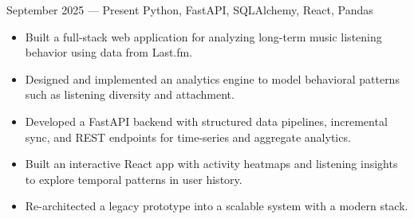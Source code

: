 {September 2025 --- Present}
{Python, FastAPI, SQLAlchemy, React, Pandas}
\begin{itemize}
    \item Built a full-stack web application for analyzing long-term music listening behavior using data from Last.fm.
    \item Designed and implemented an analytics engine to model behavioral patterns such as
        listening diversity and attachment.
    \item Developed a FastAPI backend with structured data pipelines, incremental sync, and REST endpoints for time-series and aggregate analytics.
    \item Built an interactive React app with activity heatmaps and listening insights to explore temporal patterns in user history.
    \item Re-architected a legacy prototype into a scalable system with a modern stack.
\end{itemize}
